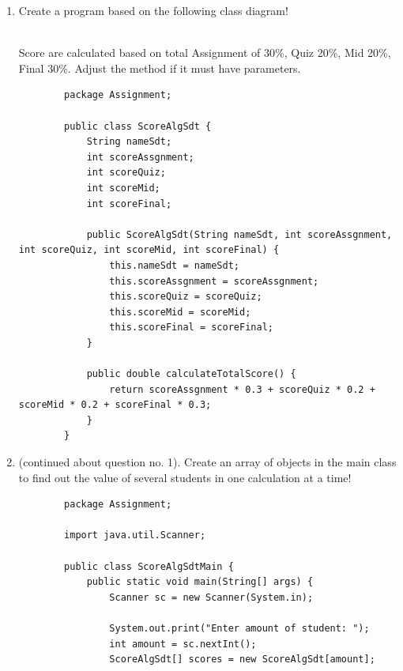 \documentclass[12pt,titlepage]{article}
\begin{document}
\begin{enumerate}
    \item Create a program based on the following class diagram!
    \mbox{}\\
    \mbox{}\\
    Score are calculated based on total Assignment of 30\%, Quiz 20\%, Mid 20\%, Final 30\%. Adjust the method if it must have parameters.
    \begin{verbatim}
        package Assignment;

        public class ScoreAlgSdt {
            String nameSdt;
            int scoreAssgnment;
            int scoreQuiz;
            int scoreMid;
            int scoreFinal;

            public ScoreAlgSdt(String nameSdt, int scoreAssgnment, int scoreQuiz, int scoreMid, int scoreFinal) {
                this.nameSdt = nameSdt;
                this.scoreAssgnment = scoreAssgnment;
                this.scoreQuiz = scoreQuiz;
                this.scoreMid = scoreMid;
                this.scoreFinal = scoreFinal;
            }

            public double calculateTotalScore() {
                return scoreAssgnment * 0.3 + scoreQuiz * 0.2 + scoreMid * 0.2 + scoreFinal * 0.3;
            }
        }
    \end{verbatim}
    \item (continued about question no. 1). Create an array of objects in the main class to find out the value of several students in one calculation at a time!
    \begin{verbatim}
        package Assignment;

        import java.util.Scanner;

        public class ScoreAlgSdtMain {
            public static void main(String[] args) {
                Scanner sc = new Scanner(System.in);

                System.out.print("Enter amount of student: ");
                int amount = sc.nextInt();
                ScoreAlgSdt[] scores = new ScoreAlgSdt[amount];


\end{verbatim}
\end{enumerate}
\end{document}
